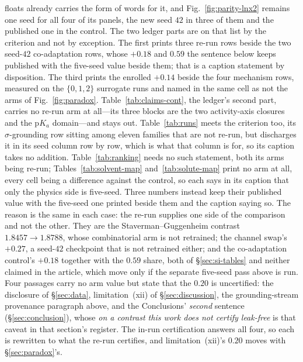 floats already carries the form of words for it, and Fig.~\ref{fig:parity-lnx2} remains one seed for all
four of its panels, the new seed $42$ in three of them and the published one in the control.
The two ledger parts are on that list by the criterion and not by exception. The first prints three
re-run rows beside the two seed-$42$ co-adaptation rows, whose $+0.18$ and $0.59$ the sentence below
keeps published with the five-seed value beside them; that is a caption statement by disposition.
The third prints the enrolled $+0.14$ beside the four mechanism rows, measured on the
$\{0,1,2\}$ surrogate runs and named in the same cell as not the arms of Fig.~\ref{fig:paradox}.
Table~\ref{tab:claims-cont}, the ledger's second part, carries no re-run arm at all---its three
blocks are the two activity-axis closures and the $\mathrm pK_a$ domain---and stays out.
Table~\ref{tab:runs} meets the criterion too, its $\sigma$-grounding row sitting among eleven
families that are not re-run, but discharges it in its seed column row by row, which is what that
column is for, so its caption takes no addition.
Table~\ref{tab:ranking} needs no such statement, both its arms being re-run;
Tables~\ref{tab:solvent-map} and~\ref{tab:solute-map} print no arm at all, every cell being a
difference against the control, so each says in its caption that only the physics side is five-seed.
Three numbers instead keep their published value with the five-seed one printed beside them and the
caption saying so. The reason is the same in each case: the re-run supplies one side of the
comparison and not the other. They are the
Staverman--Guggenheim contrast $1.8457\to1.8788$, whose combinatorial arm is not retrained; the
channel swap's $+0.27$, a seed-$42$ checkpoint that is not retrained either; and the co-adaptation
control's $+0.18$ together with the $0.59$ share, both of \S\ref{sec:si-tables} and neither
claimed in the article, which move only if the
separate five-seed pass above is run. Four passages carry no arm value but state that the $0.20$ is
uncertified: the disclosure of \S\ref{sec:data}, limitation~(xii) of \S\ref{sec:discussion}, the
grounding-stream provenance paragraph above, and the Conclusions' \emph{second} sentence
(\S\ref{sec:conclusion}), whose \emph{on a contrast this work does not certify leak-free} is that
caveat in that section's register. The in-run certification answers all four, so each is
rewritten to what the re-run certifies, and limitation~(xii)'s $0.20$ moves with \S\ref{sec:paradox}'s.
